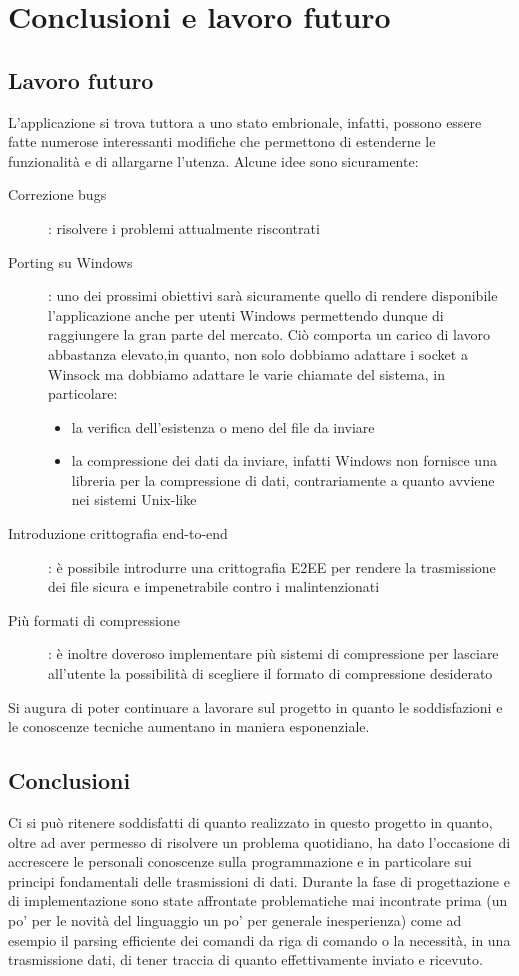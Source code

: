 \documentclass[11pt,fleqn]{book} %
\begin{document}

\chapter{Conclusioni e lavoro futuro}

\section{Lavoro futuro}
L'applicazione si trova tuttora a uno stato embrionale, infatti, possono essere fatte numerose interessanti modifiche che permettono di estenderne le funzionalità e di allargarne l'utenza. 
Alcune idee sono sicuramente:
\medskip
\begin{description}
	\item[Correzione bugs]: risolvere i problemi attualmente riscontrati
	\item[Porting su Windows]: uno dei prossimi obiettivi sarà sicuramente quello di rendere disponibile l'applicazione anche per utenti Windows 			permettendo dunque di raggiungere la gran parte del mercato. Ciò comporta un carico di lavoro abbastanza elevato,in quanto, non solo dobbiamo 			adattare i socket a Winsock ma dobbiamo adattare le varie chiamate del sistema, in particolare:
			\begin{itemize}
				\item la verifica dell'esistenza o meno del file da inviare
				\item la compressione dei dati da inviare, infatti Windows non fornisce una libreria  per la compressione di dati, contrariamente a 					quanto avviene nei sistemi Unix-like
			\end{itemize}
	\item[Introduzione crittografia end-to-end]: è possibile introdurre una crittografia E2EE per rendere la trasmissione dei file sicura e 				impenetrabile contro i malintenzionati
	\item[Più formati di compressione]: è inoltre doveroso implementare più sistemi di compressione per lasciare all'utente la possibilità di 				scegliere il formato di compressione desiderato
\end{description}

Si augura di poter continuare a lavorare sul progetto in quanto le soddisfazioni e le conoscenze tecniche aumentano in maniera esponenziale.


\section{Conclusioni}
Ci si può ritenere soddisfatti di quanto realizzato in questo progetto in quanto, oltre ad aver permesso di risolvere un problema quotidiano, ha dato l'occasione di accrescere le personali conoscenze sulla programmazione e in particolare sui principi fondamentali delle trasmissioni di dati.
Durante la fase di progettazione e di implementazione sono state affrontate problematiche mai incontrate  prima (un po' per le novità del linguaggio un po' per generale inesperienza) come ad esempio il parsing efficiente dei comandi da riga di comando o la necessità, in una trasmissione dati, di tener traccia di quanto effettivamente inviato e ricevuto.
\end{document}
